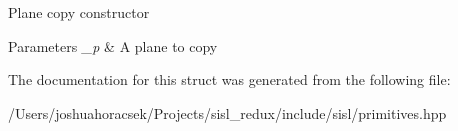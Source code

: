 Plane copy constructor 
\begin{DoxyParams}{Parameters}
{\em \+\_\+p} & A plane to copy \\
\hline
\end{DoxyParams}


The documentation for this struct was generated from the following file\+:\begin{DoxyCompactItemize}
\item 
/\+Users/joshuahoracsek/\+Projects/sisl\+\_\+redux/include/sisl/primitives.\+hpp\end{DoxyCompactItemize}
